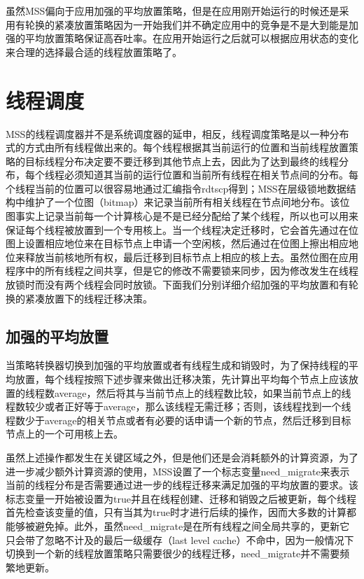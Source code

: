 虽然MSS偏向于应用加强的平均放置策略，但是在应用刚开始运行的时候还是采用有轮换的紧凑放置策略因为一开始我们并不确定应用中的竞争是不是大到能是加强的平均放置策略保证高吞吐率。在应用开始运行之后就可以根据应用状态的变化来合理的选择最合适的线程放置策略了。

\section{线程调度}
MSS的线程调度器并不是系统调度器的延申，相反，线程调度策略是以一种分布式的方式由所有线程做出来的。每个线程根据其当前运行的位置和当前线程放置策略的目标线程分布决定要不要迁移到其他节点上去，因此为了达到最终的线程分布，每个线程必须知道其当前的运行位置和当前所有线程在相关节点间的分布。每个线程当前的位置可以很容易地通过汇编指令rdtscp得到；MSS在层级锁地数据结构中维护了一个位图（bitmap）来记录当前所有相关线程在节点间地分布。该位图事实上记录当前每一个计算核心是不是已经分配给了某个线程，所以也可以用来保证每个线程被放置到一个专用核上。当一个线程决定迁移时，它会首先通过在位图上设置相应地位来在目标节点上申请一个空闲核，然后通过在位图上擦出相应地位来释放当前核地所有权，最后迁移到目标节点上相应的核上去。虽然位图在应用程序中的所有线程之间共享，但是它的修改不需要锁来同步，因为修改发生在线程放锁时而没有两个线程会同时放锁。下面我们分别详细介绍加强的平均放置和有轮换的紧凑放置下的线程迁移决策。

\subsection{加强的平均放置}
当策略转换器切换到加强的平均放置或者有线程生成和销毁时，为了保持线程的平均放置，每个线程按照下述步骤来做出迁移决策，先计算出平均每个节点上应该放置的线程数average，然后将其与当前节点上的线程数比较，如果当前节点上的线程数较少或者正好等于average，那么该线程无需迁移；否则，该线程找到一个线程数少于average的相关节点或者有必要的话申请一个新的节点，然后迁移到目标节点上的一个可用核上去。

虽然上述操作都发生在关键区域之外，但是他们还是会消耗额外的计算资源，为了进一步减少额外计算资源的使用，MSS设置了一个标志变量need\_migrate来表示当前的线程分布是否需要通过进一步的线程迁移来满足加强的平均放置的要求。该标志变量一开始被设置为true并且在线程创建、迁移和销毁之后被更新，每个线程首先检查该变量的值，只有当其为true时才进行后续的操作，因而大多数的计算都能够被避免掉。此外，虽然need\_migrate是在所有线程之间全局共享的，更新它只会带了忽略不计及的最后一级缓存（last level cache）不命中，因为一般情况下切换到一个新的线程放置策略只需要很少的线程迁移，need\_migrate并不需要频繁地更新。
